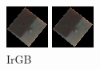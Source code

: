 \documentclass[a4paper,12pt]{article}  %
\begin{document}
\begin{figure}[H]
\begin{minipage}{0.24\textwidth}
        \includegraphics[width=\linewidth]{spektralne/irgb_budynek7.png}
        \caption*{IrGB}
    \end{minipage}
    \begin{minipage}{0.24\textwidth}
        \centering
        \includegraphics[width=\linewidth]{spektralne/irgb_budynek7.png}

\end{minipage}
\end{figure}
\end{document}
